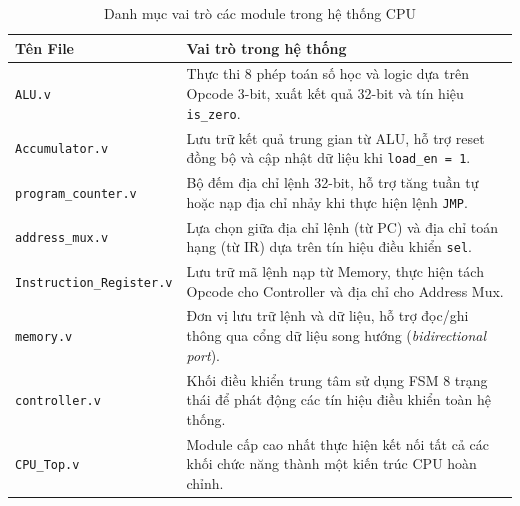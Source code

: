 \begin{table}[H]
\centering
\caption{Danh mục vai trò các module trong hệ thống CPU}
\renewcommand{\arraystretch}{1.5}
\begin{tabularx}{\textwidth}{|l|>{\raggedright\arraybackslash}X|}
\hline
\rowcolor[HTML]{EFEFEF} 
\textbf{Tên File} & \textbf{Vai trò trong hệ thống} \\ \hline
\texttt{ALU.v} & Thực thi 8 phép toán số học và logic dựa trên Opcode 3-bit, xuất kết quả 32-bit và tín hiệu \texttt{is\_zero}. \\ \hline
\texttt{Accumulator.v} & Lưu trữ kết quả trung gian từ ALU, hỗ trợ reset đồng bộ và cập nhật dữ liệu khi \texttt{load\_en = 1}. \\ \hline
\texttt{program\_counter.v} & Bộ đếm địa chỉ lệnh 32-bit, hỗ trợ tăng tuần tự hoặc nạp địa chỉ nhảy khi thực hiện lệnh \texttt{JMP}. \\ \hline
\texttt{address\_mux.v} & Lựa chọn giữa địa chỉ lệnh (từ PC) và địa chỉ toán hạng (từ IR) dựa trên tín hiệu điều khiển \texttt{sel}. \\ \hline
\texttt{Instruction\_Register.v} & Lưu trữ mã lệnh nạp từ Memory, thực hiện tách Opcode cho Controller và địa chỉ cho Address Mux. \\ \hline
\texttt{memory.v} & Đơn vị lưu trữ lệnh và dữ liệu, hỗ trợ đọc/ghi thông qua cổng dữ liệu song hướng (\textit{bidirectional port}). \\ \hline
\texttt{controller.v} & Khối điều khiển trung tâm sử dụng FSM 8 trạng thái để phát động các tín hiệu điều khiển toàn hệ thống. \\ \hline
\texttt{CPU\_Top.v} & Module cấp cao nhất thực hiện kết nối tất cả các khối chức năng thành một kiến trúc CPU hoàn chỉnh. \\ \hline
\end{tabularx}
\end{table}
